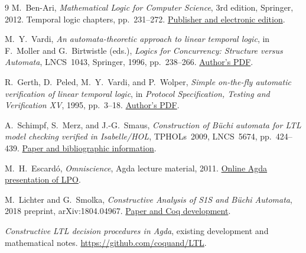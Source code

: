 \documentclass[11pt,a4paper]{article}
\begin{document}
\begin{thebibliography}{9}
M.~Ben-Ari, \emph{Mathematical Logic for Computer Science}, 3rd edition,
Springer, 2012. Temporal logic chapters, pp.~231--272.
\href{https://doi.org/10.1007/978-1-4471-4129-7}{Publisher and electronic edition}.

M.~Y.~Vardi, \emph{An automata-theoretic approach to linear temporal logic},
in F.~Moller and G.~Birtwistle (eds.), \emph{Logics for Concurrency:
Structure versus Automata}, LNCS~1043, Springer, 1996, pp.~238--266.
\href{https://www.cs.rice.edu/~vardi/papers/banff94rj.pdf}{Author's PDF}.

R.~Gerth, D.~Peled, M.~Y.~Vardi, and P.~Wolper,
\emph{Simple on-the-fly automatic verification of linear temporal logic},
in \emph{Protocol Specification, Testing and Verification XV}, 1995,
pp.~3--18.
\href{https://www.cs.rice.edu/~vardi/papers/pstv95rj.pdf}{Author's PDF}.

A.~Schimpf, S.~Merz, and J.-G.~Smaus,
\emph{Construction of B\"uchi automata for LTL model checking verified in
Isabelle/HOL}, TPHOLs~2009, LNCS~5674, pp.~424--439.
\href{https://homepages.loria.fr/SMerz/papers/tphols2009.html}{Paper and bibliographic information}.

M.~H.~Escard\'o, \emph{Omniscience}, Agda lecture material, 2011.
\href{https://cs.ioc.ee/ewscs/2012/escardo/agda/Omniscience.html}{Online Agda presentation of LPO}.

M.~Lichter and G.~Smolka, \emph{Constructive Analysis of S1S and B\"uchi
Automata}, 2018 preprint, arXiv:1804.04967.
\href{https://www.ps.uni-saarland.de/extras/S1S/}{Paper and Coq development}.

\emph{Constructive LTL decision procedures in Agda}, existing development
and mathematical notes. \url{https://github.com/coquand/LTL}.
\end{thebibliography}
\end{document}
